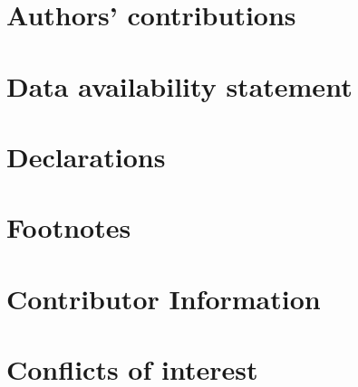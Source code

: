 \documentclass{article}
\begin{document}
		\section{Authors' contributions}
		
		\section{Data availability statement}
		
		\section{Declarations}
		
		\section{Footnotes}
		
		\section{Contributor Information}
		
		 
		
	
		\newpage
		\section{Conflicts of interest}
		
		
		
		
		
	
	
	
	\newpage
\end{document}
